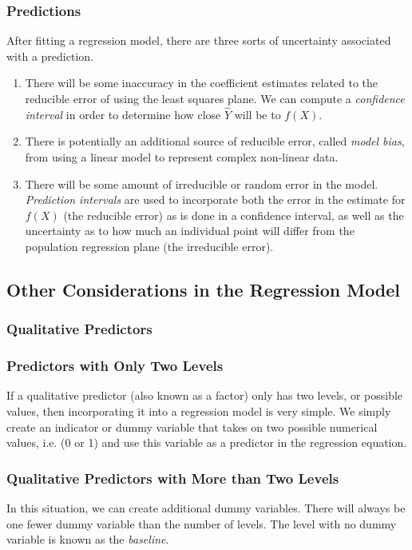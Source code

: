 \documentclass{article}
\numberwithin{equation}{section}
\begin{document}
\subsubsection*{Predictions}
After fitting a regression model, there are three sorts of uncertainty associated with a prediction.
\begin{enumerate}
    \item There will be some inaccuracy in the coefficient estimates related to the reducible error of using the least squares plane. We can compute a \textit{confidence interval} in order to determine how close $\hat Y$ will be to $f(X)$.
    \item There is potentially an additional source of reducible error, called \textit{model bias}, from using a linear model to represent complex non-linear data.
    \item There will be some amount of irreducible or random error in the model.  \textit{Prediction intervals} are used to incorporate both the error in the estimate for $f(X)$ (the reducible error) as is done in a confidence interval, as well as the uncertainty as to how much an individual point will differ from the population regression plane (the irreducible error). 
\end{enumerate}


\subsection{Other Considerations in the Regression Model}
\subsubsection{Qualitative Predictors}
\subsubsection*{Predictors with Only Two Levels}
If a qualitative predictor (also known as a factor) only has two levels, or possible values, then incorporating it into a regression model is very simple. We simply create an indicator or dummy variable that takes on two possible numerical values, i.e. (0 or 1) and use this variable as a predictor in the regression equation.

\subsubsection*{Qualitative Predictors with More than Two Levels}
In this situation, we can create additional dummy variables. There will always be one fewer dummy variable than the number of levels. The level with no dummy variable is known as the \textit{baseline}.
\end{document}
